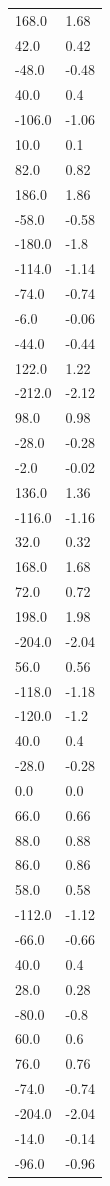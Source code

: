 \begin{longtable}{ll}
168.0 & 1.68 \\
42.0 & 0.42 \\
-48.0 & -0.48 \\
40.0 & 0.4 \\
-106.0 & -1.06 \\
10.0 & 0.1 \\
82.0 & 0.82 \\
186.0 & 1.86 \\
-58.0 & -0.58 \\
-180.0 & -1.8 \\
-114.0 & -1.14 \\
-74.0 & -0.74 \\
-6.0 & -0.06 \\
-44.0 & -0.44 \\
122.0 & 1.22 \\
-212.0 & -2.12 \\
98.0 & 0.98 \\
-28.0 & -0.28 \\
-2.0 & -0.02 \\
136.0 & 1.36 \\
-116.0 & -1.16 \\
32.0 & 0.32 \\
168.0 & 1.68 \\
72.0 & 0.72 \\
198.0 & 1.98 \\
-204.0 & -2.04 \\
56.0 & 0.56 \\
-118.0 & -1.18 \\
-120.0 & -1.2 \\
40.0 & 0.4 \\
-28.0 & -0.28 \\
0.0 & 0.0 \\
66.0 & 0.66 \\
88.0 & 0.88 \\
86.0 & 0.86 \\
58.0 & 0.58 \\
-112.0 & -1.12 \\
-66.0 & -0.66 \\
40.0 & 0.4 \\
28.0 & 0.28 \\
-80.0 & -0.8 \\
60.0 & 0.6 \\
76.0 & 0.76 \\
-74.0 & -0.74 \\
-204.0 & -2.04 \\
-14.0 & -0.14 \\
-96.0 & -0.96 \\

\end{longtable}
